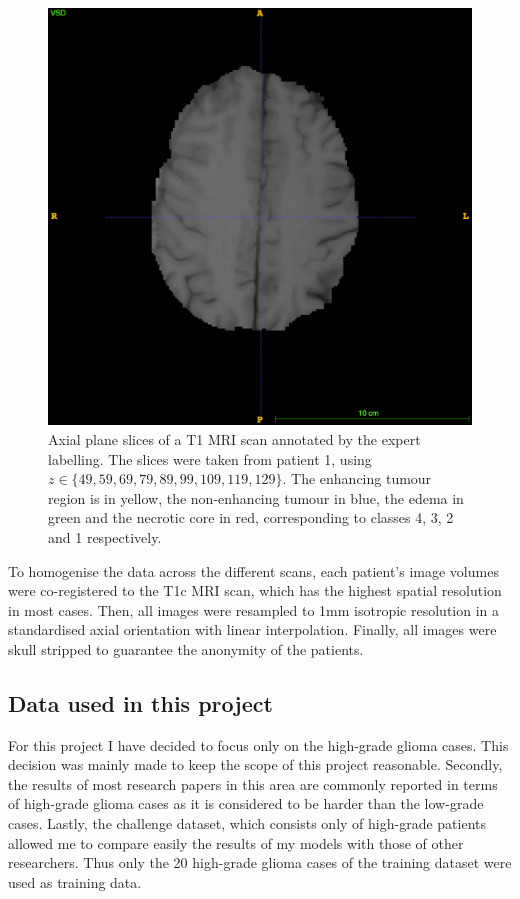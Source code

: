 \documentclass[12pt,a4paper,twoside,openright]{report}
\begin{document}
\begin{figure}[h]
	\includegraphics[scale=0.1]{expert_segmentation_129}
	\caption[Slices of a T1 MRI scan annotated with the expert labelling.]{Axial plane slices of a T1 MRI scan annotated by the expert labelling. The slices were taken from patient 1, using $z \in \{49, 59, 69, 79, 89, 99, 109, 119, 129\}$. The enhancing tumour region is in yellow, the non-enhancing tumour in blue, the edema in green and the necrotic core in red, corresponding to classes 4, 3, 2 and 1 respectively.}
	\label{fig:mri_scans}
\end{figure}

To homogenise the data across the different scans, each patient's image volumes were co-registered to the T1c MRI scan, which has the highest spatial resolution in most cases. Then, all images were resampled to 1mm isotropic resolution in a standardised axial orientation with linear interpolation. Finally, all images were skull stripped to guarantee the anonymity of the patients.


\subsection{Data used in this project}
For this project I have decided to focus only on the high-grade glioma cases. This decision was mainly made to keep the scope of this project reasonable. Secondly, the results of most research papers in this area are commonly reported in terms of high-grade glioma cases as it is considered to be harder than the low-grade cases. Lastly, the challenge dataset, which consists only of high-grade patients allowed me to compare easily the results of my models with those of other researchers. Thus only the 20 high-grade glioma cases of the training dataset were used as training data. 
\end{document}
